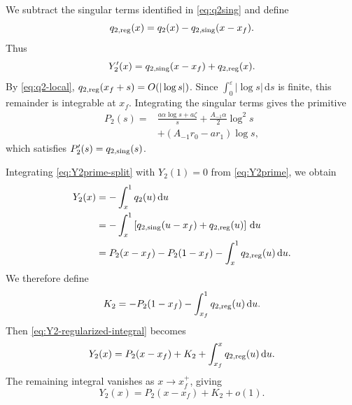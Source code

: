 \documentclass[11pt]{article}
\newcommand{\xf}{x_f}
\newcommand{\dd}{\,\mathrm d}
\begin{document}
We subtract the singular terms identified in \cref{eq:q2sing} and define
\begin{equation}
q_{2,\rm reg}(x)=q_2(x)-q_{2,\rm sing}(x-\xf).
\label{eq:q2reg}
\end{equation}
Thus
\begin{equation}
Y_2'(x)=q_{2,\rm sing}(x-\xf)+q_{2,\rm reg}(x).
\label{eq:Y2prime-split}
\end{equation}
By \cref{eq:q2-local}, \(q_{2,\rm reg}(\xf+s)=O(|\log s|)\). Since \(\int_0^\varepsilon|\log s|\dd s\) is finite, this remainder is integrable at \(\xf\). Integrating the singular terms gives the primitive
\begin{equation}
\begin{aligned}
P_2(s)={}&\frac{a\alpha\log s+a\zeta}{s}
+\frac{A_{-1}\alpha}{2}\log^2s\\
&+(A_{-1}r_0-ar_1)\log s,
\end{aligned}
\label{eq:P2}
\end{equation}
which satisfies \(P_2'(s)=q_{2,\rm sing}(s)\).

Integrating \cref{eq:Y2prime-split} with \(Y_2(1)=0\) from \cref{eq:Y2prime}, we obtain
\begin{equation}
\begin{aligned}
Y_2(x)&=-\int_x^1q_2(u)\dd u\\
&=-\int_x^1\left[q_{2,\rm sing}(u-\xf)+q_{2,\rm reg}(u)\right]\dd u\\
&=P_2(x-\xf)-P_2(1-\xf)-\int_x^1q_{2,\rm reg}(u)\dd u.
\end{aligned}
\label{eq:Y2-regularized-integral}
\end{equation}
We therefore define
\begin{equation}
K_2=-P_2(1-\xf)-\int_{\xf}^{1}q_{2,\rm reg}(u)\dd u.
\label{eq:K2}
\end{equation}
Then \cref{eq:Y2-regularized-integral} becomes
\[
Y_2(x)=P_2(x-\xf)+K_2+\int_{\xf}^{x}q_{2,\rm reg}(u)\dd u.
\]
The remaining integral vanishes as \(x\to\xf^+\), giving
\begin{equation}
Y_2(x)=P_2(x-\xf)+K_2+o(1).
\label{eq:Y2-local}
\end{equation}
\end{document}

